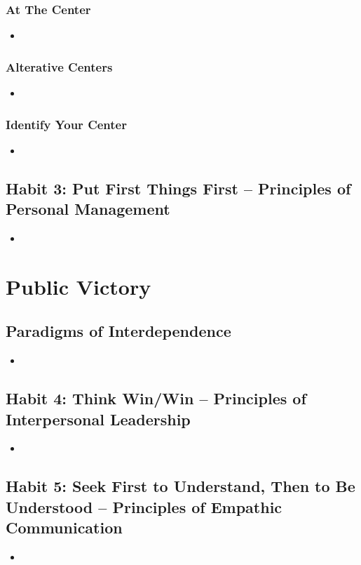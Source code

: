 \documentclass[11pt]{article}
\begin{document}
\subsubsection{At The Center}
\begin{itemize}
\item 
\end{itemize}
\subsubsection{Alterative Centers}
\begin{itemize}
\item 
\end{itemize}
\subsubsection{Identify Your Center}
\begin{itemize}
\item 
\end{itemize}
\subsection{Habit 3: Put First Things First -- Principles of Personal Management}
\begin{itemize}
\item 
\end{itemize}
\section{Public Victory}
\subsection{Paradigms of Interdependence}
\begin{itemize}
\item 
\end{itemize}
\subsection{Habit 4: Think Win/Win -- Principles of Interpersonal Leadership}
\begin{itemize}
\item 
\end{itemize}
\subsection{Habit 5: Seek First to Understand, Then to Be Understood -- Principles of Empathic Communication}
\begin{itemize}
\item 
\end{itemize}
\end{document}
